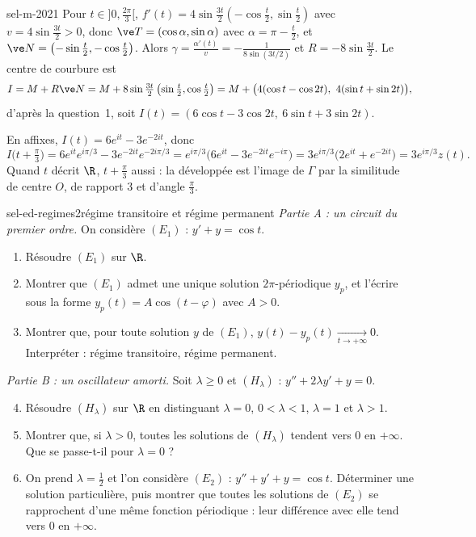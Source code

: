 \begin{corrige}{sel-m-2021}
 Pour $t\in\big]0,\frac{2\pi}3\big[$, $f'(t)=4\sin\frac{3t}2\left(-\cos\frac t2,\sin\frac t2\right)$ avec $v=4\sin\frac{3t}2>0$, donc $\ve T=(\cos\alpha,\sin\alpha)$ avec $\alpha=\pi-\frac t2$, et $\ve N=\left(-\sin\frac t2,-\cos\frac t2\right)$. Alors $\gamma=\frac{\alpha'(t)}{v}=-\frac1{8\sin(3t/2)}$ et $R=-8\sin\frac{3t}2$. Le centre de courbure est
\[I=M+R\ve N=M+8\sin\tfrac{3t}2\left(\sin\tfrac t2,\cos\tfrac t2\right)=M+\big(4(\cos t-\cos2t),\ 4(\sin t+\sin2t)\big),\]
d'après la question~1, soit $I(t)=(6\cos t-3\cos2t,\ 6\sin t+3\sin2t)$.

 En affixes, $I(t)=6e^{it}-3e^{-2it}$, donc
\[I\big(t+\tfrac\pi3\big)=6e^{it}e^{i\pi/3}-3e^{-2it}e^{-2i\pi/3}=e^{i\pi/3}\big(6e^{it}-3e^{-2it}e^{-i\pi}\big)=3e^{i\pi/3}\big(2e^{it}+e^{-2it}\big)=3e^{i\pi/3}z(t).\]
Quand $t$ décrit $\R$, $t+\frac\pi3$ aussi : la développée est l'image de $\Gamma$ par la similitude de centre $O$, de rapport $3$ et d'angle $\frac\pi3$.
\end{corrige}

\begin{exo}{sel-ed-regimes}{2}{régime transitoire et régime permanent}
\emph{Partie A : un circuit du premier ordre.} On considère $(E_1)$ : $y'+y=\cos t$.
\begin{enumerate}
\item Résoudre $(E_1)$ sur $\R$.
\item Montrer que $(E_1)$ admet une unique solution $2\pi$-périodique $y_p$, et l'écrire sous la forme $y_p(t)=A\cos(t-\varphi)$ avec $A>0$.
\item Montrer que, pour toute solution $y$ de $(E_1)$, $y(t)-y_p(t)\xrightarrow[t\to+\infty]{}0$. Interpréter : régime transitoire, régime permanent.
\end{enumerate}
\emph{Partie B : un oscillateur amorti.} Soit $\lambda\geq0$ et $(H_\lambda)$ : $y''+2\lambda y'+y=0$.
\begin{enumerate}\setcounter{enumi}{3}
\item Résoudre $(H_\lambda)$ sur $\R$ en distinguant $\lambda=0$, $0<\lambda<1$, $\lambda=1$ et $\lambda>1$.
\item Montrer que, si $\lambda>0$, toutes les solutions de $(H_\lambda)$ tendent vers $0$ en $+\infty$. Que se passe-t-il pour $\lambda=0$ ?
\item On prend $\lambda=\frac12$ et l'on considère $(E_2)$ : $y''+y'+y=\cos t$. Déterminer une solution particulière, puis montrer que toutes les solutions de $(E_2)$ se rapprochent d'une même fonction périodique : leur différence avec elle tend vers $0$ en $+\infty$.
\end{enumerate}
\end{exo}

